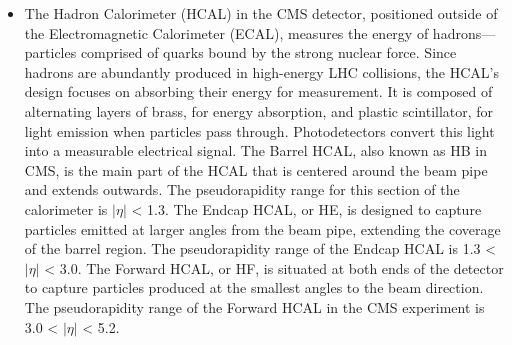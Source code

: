 \begin{itemize}
\item The Hadron Calorimeter (HCAL) in the CMS detector, positioned outside of the Electromagnetic Calorimeter (ECAL), measures the energy of hadrons—particles comprised of quarks bound by the strong nuclear force. Since hadrons are abundantly produced in high-energy LHC collisions, the HCAL's design focuses on absorbing their energy for measurement. It is composed of alternating layers of brass, for energy absorption, and plastic scintillator, for light emission when particles pass through. Photodetectors convert this light into a measurable electrical signal. The Barrel HCAL, also known as HB in CMS, is the main part of the HCAL that is centered around the beam pipe and extends outwards. The pseudorapidity range for this section of the calorimeter is $|\eta|$ < 1.3. The Endcap HCAL, or HE, is designed to capture particles emitted at larger angles from the beam pipe, extending the coverage of the barrel region. The pseudorapidity range of the Endcap HCAL is 1.3 < $|\eta|$ < 3.0. The Forward HCAL, or HF, is situated at both ends of the detector to capture particles produced at the smallest angles to the beam direction. The pseudorapidity range of the Forward HCAL in the CMS experiment is 3.0 < $|\eta|$ < 5.2.




\end{itemize}
